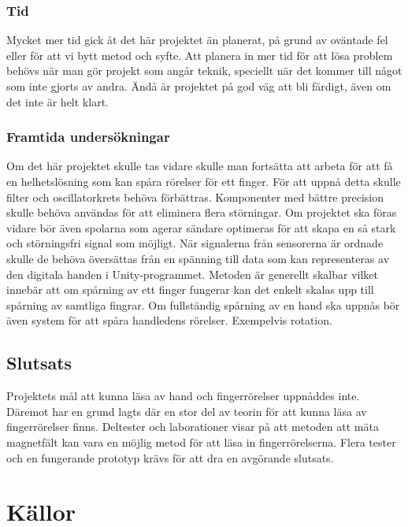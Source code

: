 \documentclass[a4paper]{article}
\makeatletter
\let\\\@raggedtwoe@savedcr%
\makeatother
\begin{document}
\begin{sloppypar}
    \subsubsection{Tid}
    Mycket mer tid gick åt det här projektet än planerat, på grund av oväntade fel eller för att vi bytt metod och syfte. Att planera in mer tid för att lösa problem behövs när man gör projekt som angår teknik, speciellt när det kommer till något som inte gjorts av andra. Ändå är projektet på god väg att bli färdigt, även om det inte är helt klart.

    \subsubsection{Framtida undersökningar}
    Om det här projektet skulle tas vidare skulle man fortsätta att arbeta för att få en helhetslösning som kan spåra
    rörelser för ett finger. För att uppnå detta skulle filter och oscillatorkrets behöva förbättras. Komponenter med
    bättre precision skulle behöva användas för att eliminera flera störningar. Om projektet ska föras vidare bör även
    spolarna som agerar sändare optimeras för att skapa en så stark och störningsfri signal som möjligt.
    \\\\
    När signalerna från sensorerna är ordnade skulle de behöva översättas från en spänning till data som kan representeras
    av den digitala handen i Unity-programmet. Metoden är generellt skalbar vilket innebär att om spårning av ett finger
    fungerar kan det enkelt skalas upp till spårning av samtliga fingrar. Om fullständig spårning av en hand ska uppnås bör
    även system för att spåra handledens rörelser. Exempelvis rotation.
    \subsection{Slutsats}
    Projektets mål att kunna läsa av hand och fingerrörelser uppnåddes inte. Däremot har en grund lagts där en stor del av
    teorin för att kunna läsa av fingerrörelser finns. Deltester och laborationer visar på att metoden att mäta magnetfält
    kan vara en möjlig metod för att läsa in fingerrörelserna. Flera tester och en fungerande prototyp krävs för att dra
    en avgörande slutsats.


    \newpage

    \section{Källor}
    \printbibliography[heading=none]


\end{sloppypar}
\end{document}
